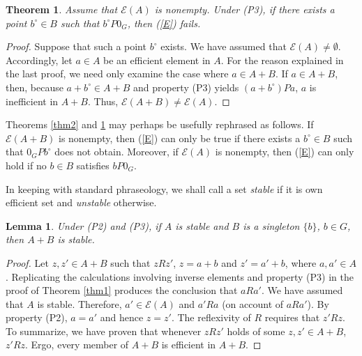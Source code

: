 \documentclass[pdflatex,sn-apa,11pt]{sn-jnl}%
\newtheorem{theorem}{Theorem}%
\newtheorem{example}{Example}%
\newtheorem{lemma}{Lemma}
\begin{document}

\begin{theorem}
\label{thm3}
Assume that $\mathscr{E}(A)$ is nonempty. Under (P3), if there exists a point $b^{\circ} \in B$ such that $b^{\circ}P0_{G}$, then (\ref{E}) fails. 
\end{theorem}

\begin{proof}
Suppose that such a point $b^{\circ}$ exists. We have assumed that $\mathscr{E}(A) \neq \emptyset$. Accordingly, let $a \in A$ be an efficient element in $A$. For the reason explained in the last proof, we need only examine the case where $a \in A+B$. If $a \in A+B$, then, because $a+b^{\circ} \in A+B$ and property (P3) yields $(a+b^{\circ})Pa$, $a$ is inefficient in $A+B$. Thus, $\mathscr{E}(A + B) \neq \mathscr{E}(A)$. 
\end{proof}

Theorems \ref{thm2} and \ref{thm3} may perhaps be usefully rephrased as follows. If $\mathscr{E}(A+B)$ is nonempty, then (\ref{E}) can only be true if there exists a $b^{\circ} \in B$ such that $0_{G}Pb^{\circ}$ does not obtain. Moreover, if $\mathscr{E}(A)$ is nonempty, then (\ref{E}) can only hold if no $b \in B$ satisfies $bP0_{G}$.

In keeping with standard phraseology, we shall call a set \textit{stable} if it is own efficient set and \textit{unstable} otherwise. 


\begin{lemma}
\label{lem1}
Under (P2) and (P3), if $A$ is stable and $B$ is a singleton $\{b\}$, $b \in G$, then $A+B$ is stable.
\end{lemma}

\begin{proof}
Let $z, z' \in A+B$ such that $zRz'$, $z = a + b$ and $z' = a' + b$, where $a, a' \in A$. Replicating the calculations involving inverse elements and property (P3) in the proof of Theorem \ref{thm1} produces the conclusion that $aRa'$. We have assumed that $A$ is stable. Therefore, $a' \in \mathscr{E}(A)$ and $a'Ra$ (on account of $aRa'$). By property (P2), $a = a'$ and hence $z = z'$. The reflexivity of $R$ requires that $z'Rz$. To summarize, we have proven that whenever $zRz'$ holds of some $z, z' \in A+B$, $z'Rz$. Ergo, every member of $A+B$ is efficient in $A+B$. %
\end{proof}
\end{document}
